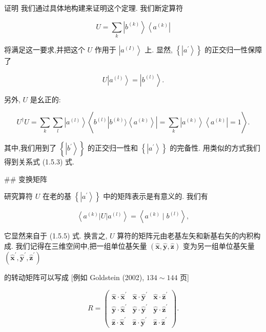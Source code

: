 \documentclass[lang=cn,newtx,10pt,scheme=chinese,thmcnt=section]{elegantbook}
\begin{document}
证明 我们通过具体地构建来证明这个定理. 我们断定算符

$$
U = \mathop{\sum }\limits_{k}\left| {b}^{\left( k\right) }\right\rangle \left\langle {a}^{\left( k\right) }\right| \tag{1.5.4}
$$

将满足这一要求,并把这个 $U$ 作用于 $\left| {a}^{\left( I\right) }\right\rangle$ 上. 显然, $\left\{ \left| {a}^{\prime }\right\rangle \right\}$ 的正交归一性保障了

$$
U\left| {a}^{\left( l\right) }\right\rangle = \left| {b}^{\left( l\right) }\right\rangle . \tag{1.5.5}
$$

另外, $U$ 是幺正的:

$$
{U}^{ \dagger }U = \mathop{\sum }\limits_{k}\mathop{\sum }\limits_{l}\left| {a}^{\left( l\right) }\right\rangle \left\langle {{b}^{\left( l\right) }\left| {{b}^{\left( k\right) }\rangle \left\langle {a}^{\left( k\right) }\right\rangle }\right| = \mathop{\sum }\limits_{k}\left| {a}^{\left( k\right) }\right\rangle \left\langle {a}^{\left( k\right) }\right| = 1}\right\rangle . \tag{1.5.6}
$$

其中,我们用到了 $\left\{ \left| {b}^{\prime }\right\rangle \right\}$ 的正交归一性和 $\left\{ \left| {a}^{\prime }\right\rangle \right\}$ 的完备性. 用类似的方式我们得到关系式 (1.5.3) 式.

## 变换矩阵

研究算符 $U$ 在老的基 $\left\{ \left| {a}^{\prime }\right\rangle \right\}$ 中的矩阵表示是有意义的. 我们有

$$
\left\langle {{a}^{\left( k\right) }\left| U\right| {a}^{\left( l\right) }}\right\rangle = \left\langle {{a}^{\left( k\right) } \mid {b}^{\left( l\right) }}\right\rangle , \tag{1.5.7}
$$

它显然来自于 (1.5.5) 式. 换言之, $U$ 算符的矩阵元由老基左矢和新基右矢的内积构成. 我们记得在三维空间中,把一组单位基矢量 $\left( {\widehat{\mathbf{x}},\widehat{\mathbf{y}},\widehat{\mathbf{z}}}\right)$ 变为另一组单位基矢量 $\left( {{\widehat{\mathbf{x}}}^{\prime },{\widehat{\mathbf{y}}}^{\prime },{\widehat{\mathbf{z}}}^{\prime }}\right)$

的转动矩阵可以写成 [例如 Goldstein (2002), ${134} \sim {144}$ 页]

$$
R = \left( \begin{array}{lll} \widehat{\mathbf{x}} \cdot {\widehat{\mathbf{x}}}^{\prime } & \widehat{\mathbf{x}} \cdot {\widehat{\mathbf{y}}}^{\prime } & \widehat{\mathbf{x}} \cdot {\widehat{\mathbf{z}}}^{\prime } \\ \widehat{\mathbf{y}} \cdot {\widehat{\mathbf{x}}}^{\prime } & \widehat{\mathbf{y}} \cdot {\widehat{\mathbf{y}}}^{\prime } & \widehat{\mathbf{y}} \cdot {\widehat{\mathbf{z}}}^{\prime } \\ \widehat{\mathbf{z}} \cdot {\widehat{\mathbf{x}}}^{\prime } & \widehat{\mathbf{z}} \cdot {\widehat{\mathbf{y}}}^{\prime } & \widehat{\mathbf{z}} \cdot {\widehat{\mathbf{z}}}^{\prime } \end{array}\right) . \tag{1.5.8}
$$
\end{document}
